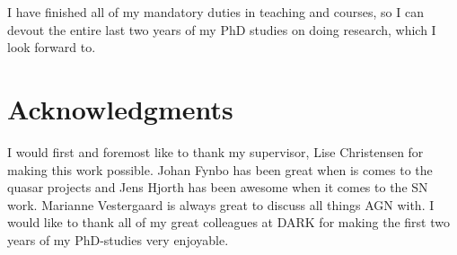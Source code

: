 I have finished all of my mandatory duties in teaching and courses, so I can
devout the entire last two years of my PhD studies on doing research, which I
look forward to.


\section{Acknowledgments}
I would first and foremost like to thank my supervisor, Lise Christensen for
making this work possible. Johan Fynbo has been great when is comes to the
quasar projects and Jens Hjorth has been awesome when it comes to the SN work.
Marianne Vestergaard is always great to discuss all things AGN with. I would
like to thank all of my great colleagues at DARK for making the first two years
of my PhD-studies very enjoyable.


